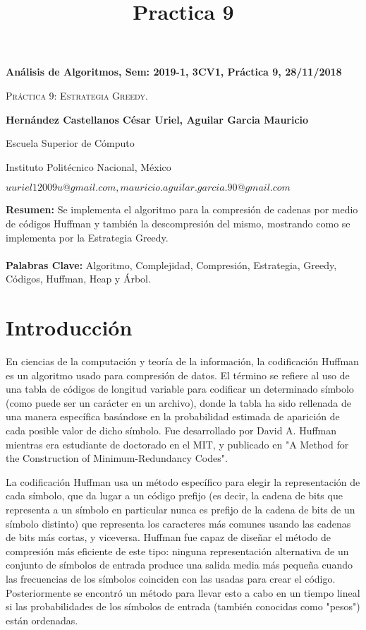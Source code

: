 \documentclass[12pt,twoside]{article}
\title{Practica 9}
\date{}
\begin{document}
\centerline{\bf An\'alisis de Algoritmos, Sem: 2019-1, 3CV1, Pr\'actica 9, 28/11/2018}
\centerline{}
\centerline{}
\begin{center}
\Large{\textsc{Pr\'actica 9: Estrategia Greedy.}}
\end{center}
\centerline{}
\centerline{\bf {Hern\'andez Castellanos C\'esar Uriel, Aguilar Garcia Mauricio}}
\centerline{}
\centerline{Escuela Superior de C\'omputo}
\centerline{Instituto Polit\'ecnico Nacional, M\'exico}
\centerline{$uuriel12009u@gmail.com, mauricio.aguilar.garcia.90@gmail.com$}
\newtheorem{Theorem}{\quad Theorem}[section]
\newtheorem{Definition}[Theorem]{\quad Definition}
\newtheorem{Corollary}[Theorem]{\quad Corollary}
\newtheorem{Lemma}[Theorem]{\quad Lemma}
\newtheorem{Example}[Theorem]{\quad Example}
\bigskip
\textbf{Resumen: } Se implementa el algoritmo para la compresión de cadenas por medio de códigos Huffman y también la descompresión del mismo, mostrando como se implementa por la Estrategia Greedy.
\\ 
\\
\textbf{Palabras Clave: } Algoritmo, Complejidad, Compresión, Estrategia, Greedy, Códigos, Huffman, Heap y Árbol.

\section{Introducción}
\label{sec:introduction}

En ciencias de la computación y teoría de la información, la codificación Huffman es un algoritmo usado para compresión de datos. El término se refiere al uso de una tabla de códigos de longitud variable para codificar un determinado símbolo (como puede ser un carácter en un archivo), donde la tabla ha sido rellenada de una manera específica basándose en la probabilidad estimada de aparición de cada posible valor de dicho símbolo. Fue desarrollado por David A. Huffman mientras era estudiante de doctorado en el MIT, y publicado en "A Method for the Construction of Minimum-Redundancy Codes".

La codificación Huffman usa un método específico para elegir la representación de cada símbolo, que da lugar a un código prefijo (es decir, la cadena de bits que representa a un símbolo en particular nunca es prefijo de la cadena de bits de un símbolo distinto) que representa los caracteres más comunes usando las cadenas de bits más cortas, y viceversa. Huffman fue capaz de diseñar el método de compresión más eficiente de este tipo: ninguna representación alternativa de un conjunto de símbolos de entrada produce una salida media más pequeña cuando las frecuencias de los símbolos coinciden con las usadas para crear el código. Posteriormente se encontró un método para llevar esto a cabo en un tiempo lineal si las probabilidades de los símbolos de entrada (también conocidas como "pesos") están ordenadas.
\end{document}
